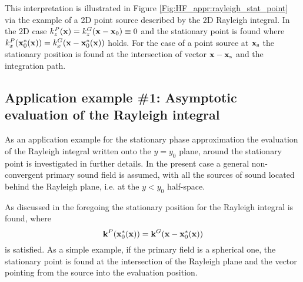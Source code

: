 This interpretation is illustrated in Figure \ref{Fig:HF_appr:rayleigh_stat_point} via the example of a 2D point source described by the 2D Rayleigh integral.
In the 2D case $k_z^P(\mathbf{x}) = k_z^G(\mathbf{x}-\mathbf{x}_0) \equiv 0$ and the stationary point is found where $k_x^P(\mathbf{x}_0^*(\mathbf{x})) = k_x^G(\mathbf{x}-\mathbf{x}_0^*(\mathbf{x}))$ holds.
For the case of a point source at $\mathbf{x}_{\mathrm{s}}$ the stationary position is found at the intersection of vector $\mathbf{x}-\mathbf{x}_{\mathrm{s}}$ and the integration path.

\subsection*{Application example \#1: Asymptotic evaluation of the Rayleigh integral}
As an application example for the stationary phase approximation the evaluation of the Rayleigh integral written onto the $y=y_0$ plane, around the stationary point is investigated in further details.
In the present case a general non-convergent primary sound field is assumed, with all the sources of sound located behind the Rayleigh plane, i.e. at the $y < y_0$ half-space.

As discussed in the foregoing the stationary position for the Rayleigh integral is found, where 
\begin{equation}
\mathbf{k}^P(\mathbf{x}_0^*(\mathbf{x})) = \mathbf{k}^G(\mathbf{x}-\mathbf{x}_0^*(\mathbf{x}))
\end{equation}
is satisfied.
As a simple example, if the primary field is a spherical one, the stationary point is found at the intersection of the Rayleigh plane and the vector pointing from the source into the evaluation position.

